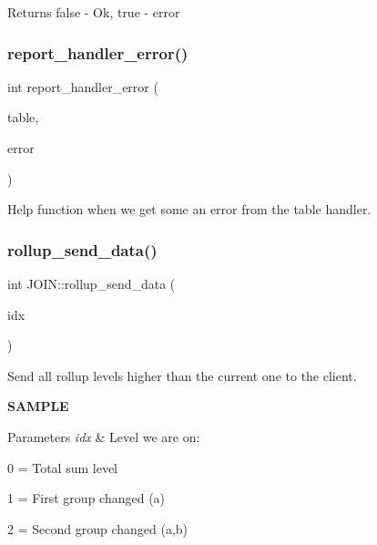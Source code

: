 \begin{DoxyReturn}{Returns}
false -\/ Ok, true -\/ error 
\end{DoxyReturn}
\mbox{\label{group__Query__Executor_ga4fb800e0e68d03a1b49a9cf66fda4006}} 
\subsubsection{\texorpdfstring{report\+\_\+handler\+\_\+error()}{report\_handler\_error()}}
{\footnotesize\ttfamily int report\+\_\+handler\+\_\+error (\begin{DoxyParamCaption}\item[{\mbox{\hyperlink{structTABLE}{T\+A\+B\+LE}} $\ast$}]{table,  }\item[{int}]{error }\end{DoxyParamCaption})}

Help function when we get some an error from the table handler. \mbox{\label{group__Query__Executor_ga148b2123bee3ebd0718d334e9f109db8}} 
\subsubsection{\texorpdfstring{rollup\+\_\+send\+\_\+data()}{rollup\_send\_data()}}
{\footnotesize\ttfamily int J\+O\+I\+N\+::rollup\+\_\+send\+\_\+data (\begin{DoxyParamCaption}\item[{uint}]{idx }\end{DoxyParamCaption})}

Send all rollup levels higher than the current one to the client.

{\bfseries S\+A\+M\+P\+LE} 
\begin{DoxyCode}{0}
\end{DoxyCode}



\begin{DoxyParams}{Parameters}
{\em idx} & Level we are on\+:
\begin{DoxyItemize}
\item 0 = Total sum level
\item 1 = First group changed (a)
\item 2 = Second group changed (a,b)
\end{DoxyItemize}\\
\hline
\end{DoxyParams}


